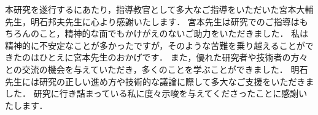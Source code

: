 本研究を遂行するにあたり，指導教官として多大なご指導をいただいた宮本大輔先生，明石邦夫先生に心より感謝いたします．
宮本先生は研究でのご指導はもちろんのこと，精神的な面でもかけがえのないご助力をいただきました．
私は精神的に不安定なことが多かったですが，そのような苦難を乗り越えることができたのはひとえに宮本先生のおかげです．
また，優れた研究者や技術者の方々との交流の機会を与えていただき，多くのことを学ぶことができました．
明石先生には研究の正しい進め方や技術的な議論に際して多大なご支援をいただきました．
研究に行き詰まっている私に度々示唆を与えてくださったことに感謝いたします．

